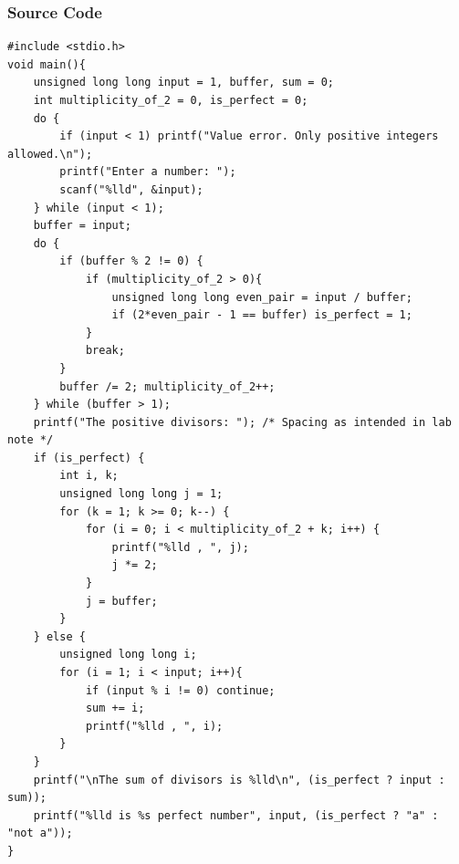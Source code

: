 \documentclass[a4paper,11pt]{article}
\theoremstyle{mytheor}
\theoremstyle{mytheor}
\begin{document}
\subsubsection{Source Code}
\begin{lstlisting}[label={list:third},title=Program's \texttt{C} code -- uses number theory to determine if number is perfect]
#include <stdio.h>
void main(){
    unsigned long long input = 1, buffer, sum = 0;
    int multiplicity_of_2 = 0, is_perfect = 0;
    do {
        if (input < 1) printf("Value error. Only positive integers allowed.\n");
        printf("Enter a number: ");
        scanf("%lld", &input);
    } while (input < 1);
    buffer = input;
    do {
        if (buffer % 2 != 0) {
            if (multiplicity_of_2 > 0){
                unsigned long long even_pair = input / buffer;
                if (2*even_pair - 1 == buffer) is_perfect = 1;
            }
            break;
        }
        buffer /= 2; multiplicity_of_2++;
    } while (buffer > 1);
    printf("The positive divisors: "); /* Spacing as intended in lab note */
    if (is_perfect) {
        int i, k;
        unsigned long long j = 1;
        for (k = 1; k >= 0; k--) {
            for (i = 0; i < multiplicity_of_2 + k; i++) {
                printf("%lld , ", j);
                j *= 2;
            }
            j = buffer;
        }
    } else {
        unsigned long long i;
        for (i = 1; i < input; i++){
            if (input % i != 0) continue;
            sum += i;
            printf("%lld , ", i);
        }
    }
    printf("\nThe sum of divisors is %lld\n", (is_perfect ? input : sum));
    printf("%lld is %s perfect number", input, (is_perfect ? "a" : "not a"));
}
\end{lstlisting}
\end{document}
